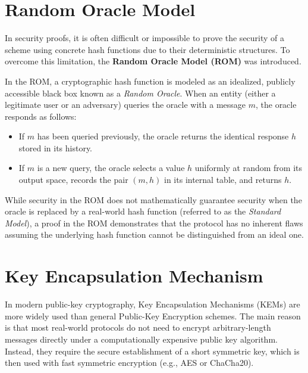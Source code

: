 \section{Random Oracle Model}

In security proofs, it is often difficult or impossible to prove the security of a scheme using concrete hash functions due to their deterministic structures. To overcome this limitation, the \textbf{Random Oracle Model (ROM)} was introduced. 

In the ROM, a cryptographic hash function is modeled as an idealized, publicly accessible black box known as a \textit{Random Oracle}. When an entity (either a legitimate user or an adversary) queries the oracle with a message $m$, the oracle responds as follows:
\begin{itemize}
\item If $m$ has been queried previously, the oracle returns the identical response $h$ stored in its history.
\item If $m$ is a new query, the oracle selects a value $h$ uniformly at random from its output space, records the pair $(m, h)$ in its internal table, and returns $h$.
\end{itemize}
While security in the ROM does not mathematically guarantee security when the oracle is replaced by a real-world hash function (referred to as the \textit{Standard Model}), a proof in the ROM demonstrates that the protocol has no inherent flaws assuming the underlying hash function cannot be distinguished from an ideal one.



\section{Key Encapsulation Mechanism}

In modern public-key cryptography, Key Encapsulation Mechanisms (KEMs) are more widely used than general Public-Key Encryption schemes. The main reason is that most real-world protocols do not need to encrypt arbitrary-length messages directly under a computationally expensive public key algorithm. Instead, they require the secure establishment of a short symmetric key, which is then used with fast symmetric encryption (e.g., AES or ChaCha20).

